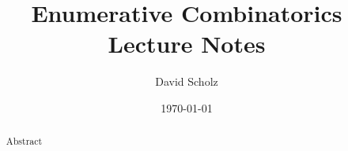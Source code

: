 \documentclass[a4paper,12pt,oneside]{article}
\title{Enumerative Combinatorics\\[0.3cm] \Large Lecture Notes}
\date{\today}
\author{David Scholz}
\theoremstyle{plain}
\theoremstyle{definition}
\theoremstyle{definition}
\begin{document}
\begin{titlingpage}
\maketitle
\end{titlingpage}

\newpage

\setcounter{page}{1} %

\thispagestyle{empty}
  
\newpage  
\pagestyle{empty}

\newpage

\begin{abstract}
    Abstract
\end{abstract} 


\newpage
\pagestyle{empty}

\tableofcontents

\newpage
\pagestyle{fancy} 


\thispagestyle{empty}
\listoffigures

\newpage
\pagestyle{fancy}
















\newpage


\thispagestyle{empty}
    
\end{document}
